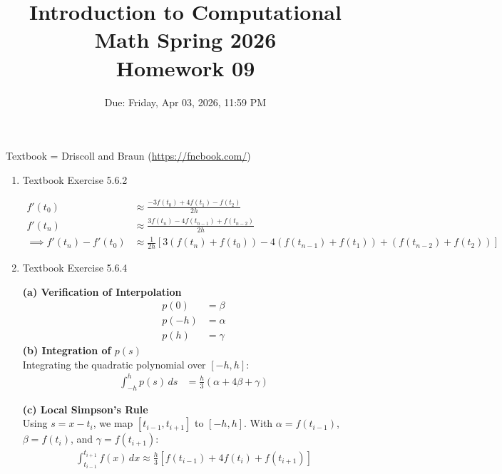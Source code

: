\documentclass[reqno, answers]{exam}
\title{Introduction to Computational Math Spring 2026 \\ Homework 09}
\date{Due: Friday, Apr 03, 2026, 11:59 PM}
\author{}
\begin{document}
\maketitle
\thispagestyle{empty}

Textbook = Driscoll and Braun (\url{https://fncbook.com/})

\begin{enumerate}

    \item Textbook Exercise 5.6.2

          \begin{solution}
              \begin{align*}
                  f'(t_0)                    & \approx \frac{-3f(t_0) + 4f(t_1) - f(t_2)}{2h}                                                       \\[1em]
                  f'(t_n)                    & \approx \frac{3f(t_n) - 4f(t_{n-1}) + f(t_{n-2})}{2h}                                                \\[1em]
                  \implies f'(t_n) - f'(t_0) & \approx \frac{1}{2h}\left[3(f(t_n) + f(t_0)) - 4(f(t_{n-1}) + f(t_1)) + (f(t_{n-2}) + f(t_2))\right]
              \end{align*}
          \end{solution}

    \item Textbook Exercise 5.6.4

          \begin{solution}

              \noindent \textbf{(a) Verification of Interpolation} \\
              \begin{align*}
                  p(0)  & = \beta  \\
                  p(-h) & = \alpha \\
                  p(h)  & = \gamma
              \end{align*}
              \vspace{1em}
              \noindent \textbf{(b) Integration of $p(s)$} \\
              Integrating the quadratic polynomial over $[-h, h]$:
              \begin{align*}
                  \int_{-h}^{h} p(s) \, ds & =  \frac{h}{3}(\alpha + 4\beta + \gamma)
              \end{align*}

              \vspace{1em}
              \noindent \textbf{(c) Local Simpson's Rule} \\
              Using $s = x - t_i$, we map $[t_{i-1}, t_{i+1}]$ to $[-h, h]$. With $\alpha = f(t_{i-1})$, $\beta = f(t_i)$, and $\gamma = f(t_{i+1})$:
              \begin{align*}
                  \int_{t_{i-1}}^{t_{i+1}} f(x) \, dx \approx \frac{h}{3}[f(t_{i-1}) + 4f(t_i) + f(t_{i+1})]
              \end{align*}
          \end{solution}


\end{enumerate}
\end{document}
